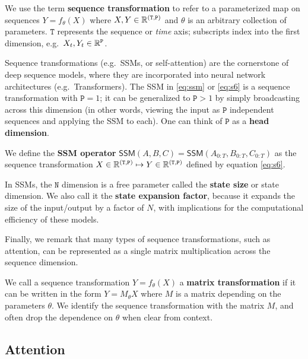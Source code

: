 \begin{definition}
  \label{def:sequence-transformation}
We use the term \textbf{sequence transformation} to refer to a parameterized map on sequences $Y = f_{\theta}(X)$ where $X, Y \in \mathbb{R}^{\mathtt{(T,P)}}$ and $\theta$ is an arbitrary collection of parameters.
$\mathtt{T}$ represents the sequence or \emph{time} axis; subscripts index into the first dimension, e.g.\ $X_t, Y_t \in \mathbb{R}^\mathtt{P}$.
\end{definition}
Sequence transformations (e.g.\ SSMs, or self-attention) are the cornerstone of deep sequence models, where they are incorporated into neural network architectures (e.g.\ Transformers).
The SSM in \eqref{eq:ssm} or \eqref{eq:s6} is a sequence transformation with $\mathtt{P}=1$; it can be generalized to $\mathtt{P} > 1$ by simply broadcasting across this dimension (in other words, viewing the input as $\mathtt{P}$ independent sequences and applying the SSM to each).
One can think of $\mathtt{P}$ as a \textbf{head dimension}\iftoggle{arxiv}{, which we will elaborate on in \cref{sec:architecture}}{}.

\begin{definition}
  \label{def:ssm}
  We define the \textbf{SSM operator}
    $\mathsf{SSM}(A, B, C) = \mathsf{SSM}(A_{0:T}, B_{0:T}, C_{0:T})$ as the sequence transformation $X \in \mathbb{R}^{\mathtt{(T,P)}} \mapsto Y \in \mathbb{R}^{\mathtt{(T,P)}}$
    defined by equation \eqref{eq:s6}.
\end{definition}

In SSMs, the $\mathtt{N}$ dimension is a free parameter called the \textbf{state size} or state dimension.
We also call it the \textbf{state expansion factor}, because it expands the size of the input/output by a factor of $N$, with implications for the computational efficiency of these models.


Finally, we remark that many types of sequence transformations, such as attention, can be represented as a single matrix multiplication across the sequence dimension.
\begin{definition}
  \label{def:matrix-transformation}
  We call a sequence transformation $Y = f_\theta(X)$ a \textbf{matrix transformation} if it can be written in the form $Y = M_\theta X$ where $M$ is a matrix depending on the parameters $\theta$.
  We identify the sequence transformation with the matrix $M$, and often drop the dependence on $\theta$ when clear from context.
\end{definition}


\subsection{Attention}
\label{sec:overview:attention}

